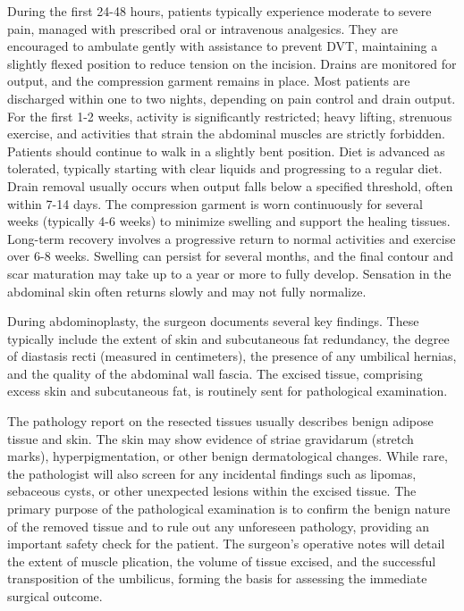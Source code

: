 During the first 24-48 hours, patients typically experience moderate to severe pain, managed with prescribed oral or intravenous analgesics. They are encouraged to ambulate gently with assistance to prevent DVT, maintaining a slightly flexed position to reduce tension on the incision. Drains are monitored for output, and the compression garment remains in place. Most patients are discharged within one to two nights, depending on pain control and drain output. For the first 1-2 weeks, activity is significantly restricted; heavy lifting, strenuous exercise, and activities that strain the abdominal muscles are strictly forbidden. Patients should continue to walk in a slightly bent position. Diet is advanced as tolerated, typically starting with clear liquids and progressing to a regular diet. Drain removal usually occurs when output falls below a specified threshold, often within 7-14 days. The compression garment is worn continuously for several weeks (typically 4-6 weeks) to minimize swelling and support the healing tissues. Long-term recovery involves a progressive return to normal activities and exercise over 6-8 weeks. Swelling can persist for several months, and the final contour and scar maturation may take up to a year or more to fully develop. Sensation in the abdominal skin often returns slowly and may not fully normalize.

During abdominoplasty, the surgeon documents several key findings. These typically include the extent of skin and subcutaneous fat redundancy, the degree of diastasis recti (measured in centimeters), the presence of any umbilical hernias, and the quality of the abdominal wall fascia. The excised tissue, comprising excess skin and subcutaneous fat, is routinely sent for pathological examination.

The pathology report on the resected tissues usually describes benign adipose tissue and skin. The skin may show evidence of striae gravidarum (stretch marks), hyperpigmentation, or other benign dermatological changes. While rare, the pathologist will also screen for any incidental findings such as lipomas, sebaceous cysts, or other unexpected lesions within the excised tissue. The primary purpose of the pathological examination is to confirm the benign nature of the removed tissue and to rule out any unforeseen pathology, providing an important safety check for the patient. The surgeon's operative notes will detail the extent of muscle plication, the volume of tissue excised, and the successful transposition of the umbilicus, forming the basis for assessing the immediate surgical outcome.

